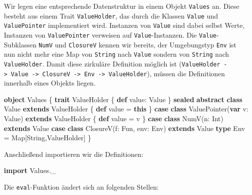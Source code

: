 \documentclass[]{article}
\newenvironment{Shaded}{}{}
\newcommand{\FunctionTok}[1]{\textcolor[rgb]{0.02,0.16,0.49}{#1}}
\newcommand{\KeywordTok}[1]{\textcolor[rgb]{0.00,0.44,0.13}{\textbf{#1}}}
\newcommand{\NormalTok}[1]{#1}
\begin{document}
Wir legen eine entsprechende Datenstruktur in einem Objekt
\texttt{Values} an. Diese besteht aus einem Trait \texttt{ValueHolder},
das durch die Klassen \texttt{Value} und \texttt{ValuePointer}
implementiert wird. Instanzen von \texttt{Value} sind dabei selbst
Werte, Instanzen von \texttt{ValuePointer} verweisen auf
\texttt{Value}-Instanzen. Die \texttt{Value}-Subklassen \texttt{NumV}
und \texttt{ClosureV} kennen wir bereits, der Umgebungstyp \texttt{Env}
ist nun nicht mehr eine Map von \texttt{String} nach \texttt{Value}
sondern von \texttt{String} nach \texttt{ValueHolder}. Damit diese
zirkuläre Definition möglich ist
(\texttt{ValueHolder\ -\textgreater{}\ Value\ -\textgreater{}\ ClosureV\ -\textgreater{}\ Env\ -\textgreater{}\ ValueHolder}),
müssen die Definitionen innerhalb eines Objekts liegen.

\begin{Shaded}
\begin{Highlighting}[]
\KeywordTok{object}\NormalTok{ Values \{}
  \KeywordTok{trait}\NormalTok{ ValueHolder \{}
    \KeywordTok{def}\NormalTok{ value: Value}
\NormalTok{  \}}
  \KeywordTok{sealed} \KeywordTok{abstract} \KeywordTok{class}\NormalTok{ Value }\KeywordTok{extends}\NormalTok{ ValueHolder \{}
    \KeywordTok{def}\NormalTok{ value = }\KeywordTok{this}
\NormalTok{  \}}
  \KeywordTok{case} \KeywordTok{class} \FunctionTok{ValuePointer}\NormalTok{(}\KeywordTok{var}\NormalTok{ v: Value) }\KeywordTok{extends}\NormalTok{ ValueHolder \{}
    \KeywordTok{def}\NormalTok{ value = v}
\NormalTok{  \}}
  \KeywordTok{case} \KeywordTok{class} \FunctionTok{NumV}\NormalTok{(n: Int) }\KeywordTok{extends}\NormalTok{ Value}
  \KeywordTok{case} \KeywordTok{class} \FunctionTok{ClosureV}\NormalTok{(f: Fun, env: Env) }\KeywordTok{extends}\NormalTok{ Value}
  \KeywordTok{type}\NormalTok{ Env = Map[String,ValueHolder]}
\NormalTok{\}}
\end{Highlighting}
\end{Shaded}

Anschließend importieren wir die Definitionen:

\begin{Shaded}
\begin{Highlighting}[]
\KeywordTok{import}\NormalTok{ Values.}\FunctionTok{\_}
\end{Highlighting}
\end{Shaded}

Die \texttt{eval}-Funktion ändert sich an folgenden Stellen:
\end{document}

